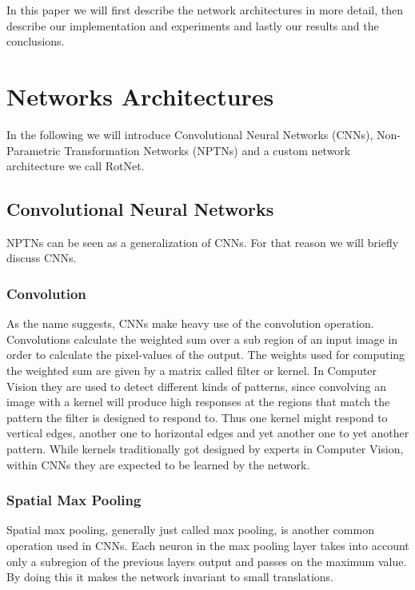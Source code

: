 \documentclass{llncs}
\begin{document}
In this paper we will first describe the network architectures in more detail, then describe our implementation and experiments and lastly our results and the conclusions.

\section{Networks Architectures} In the following we will introduce Convolutional Neural Networks (CNNs), Non-Parametric Transformation Networks (NPTNs) and a custom network architecture we call RotNet.

\subsection{Convolutional Neural Networks}
NPTNs can be seen as a generalization of CNNs. For that reason we will briefly discuss CNNs. 
\subsubsection{Convolution}
As the name suggests, CNNs make heavy use of the convolution operation. Convolutions
 calculate the weighted sum over a sub region of an input image in order to calculate the pixel-values of the output. The weights used for computing the weighted sum are given by a matrix called filter or kernel. In Computer Vision they are used to detect different kinds of patterns, since convolving an image with a kernel will produce high responses at the regions that match the pattern the filter is designed to respond to. Thus one kernel might respond to vertical edges, another  one to horizontal edges and yet another one to yet another pattern. While kernels traditionally got designed by experts in Computer Vision, within CNNs they are expected to be learned by the network.


\subsubsection{Spatial Max Pooling}
Spatial max pooling, generally just called max pooling, is another common operation used in CNNs.
Each neuron in the max pooling layer takes into account only a subregion of the previous
layers output and passes on the maximum value. By doing this it makes the network invariant to small translations. 
\end{document}
